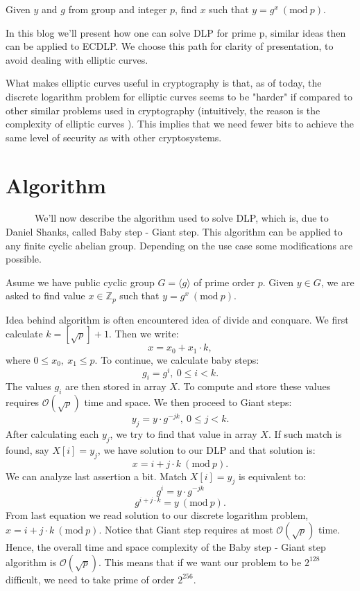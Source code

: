 \documentclass[fleqn,10pt]{olplainarticle}
\begin{document}
Given $y$ and $g$ from group and integer $p$, find $x$ such that $y=g^x \ (\textrm {mod}\ p)$.

\vspace{0.2cm}

In this blog we'll present how one can solve DLP for prime p, 
similar ideas then can be applied to ECDLP. We choose this path for clarity of presentation, 
to avoid dealing with elliptic curves.

What makes elliptic curves useful in cryptography is that, as of today, the discrete logarithm 
problem for elliptic curves seems to be "harder" if compared to other similar problems used in 
cryptography (intuitively, the reason is the complexity of elliptic curves ). 
This implies that we need fewer bits to achieve the same level of security as with other cryptosystems.

\section*{Algorithm}

\par \ \ \ \ \ \ We'll now describe the algorithm used to solve DLP, which is, due to Daniel Shanks, 
called Baby step - Giant step. This algorithm can be applied to any finite cyclic abelian group. 
Depending on the use case some modifications are possible.
\vspace{0.2cm}

Asume we have public cyclic group $G=\langle g \rangle$ of prime order $p$. Given $y\in G$, 
we are asked to find value $x\in\mathbb{Z}_p$ such that $y=g^x\ (\textrm {mod}\ p)$.
\vspace{0.2cm}

Idea behind algorithm is often encountered idea of divide and conquare. We first calculate $k=[\sqrt{p}]+1$. Then we write:
$$x=x_0+x_1\cdot k,$$
where $0\leq x_0,\ x_1\leq p$.
To continue, we calculate baby steps:
$$g_i = g^i,\ 0\leq i < k.$$
The values $g_i$ are then stored in array $X$. To compute and store these values requires $\mathcal{O}(\sqrt{p})$ time and space. We then proceed to Giant steps:
$$y_j = y\cdot g^{-jk},\ 0\leq j< k.$$
After calculating each $y_j$, we try to find that value in array $X$. If such match is found, say $X[i]=y_j$, we have solution to our DLP and that solution is:
$$x=i+j\cdot k\ (\textrm {mod}\ p).$$
We can analyze last assertion a bit. Match $X[i]=y_j$ is equivalent to:
$$g^i=y\cdot g^{-jk}$$
$$g^{i+j\cdot k}=y \ (\textrm{mod}\ p).$$
From last equation we read solution to our discrete logarithm problem, $x=i+j\cdot k\ (\textrm {mod}\ p).$
Notice that Giant step requires at most $\mathcal{O}(\sqrt{p})$ time. Hence, the overall time 
and space complexity of the Baby step - Giant step algorithm is $\mathcal{O}(\sqrt{p})$. 
This means that if we want our problem to be $2^{128}$ difficult, we need to take prime of 
order $2^{256}$.
\end{document}
